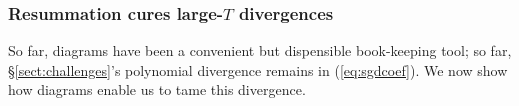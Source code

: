 \documentclass[anon,12pt]{colt2021} %
\newcommand{\uvalue}{\text{\textnormal{uvalue}}}
\newcommand{\plotmoow}[3]{\texttt{[image: ../\#1]}}
\newcommand{\sizeddia}[2]{%
    \begin{gathered}%
        \texttt{[image: ../diagrams/\#1.png]}%
    \end{gathered}%
}
\newcommand{\mdia}[1]{\protect \sizeddia{#1}{0.14}}
\newcommand{\sdia}[1]{\protect \sizeddia{#1}{0.10}}
\begin{document}
{            %





            \subsubsection{Resummation cures large-$T$ divergences}\label{sect:resummation}
            So far, diagrams have been a convenient but dispensible
            book-keeping tool; so far, \S\ref{sect:challenges}'s polynomial
            divergence remains in (\ref{eq:sgdcoef}).  We now show how
            diagrams enable us to tame this divergence.

}
\end{document}
